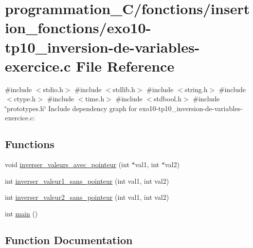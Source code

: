 \hypertarget{exo10-tp10__inversion-de-variables-exercice_8c}{}\section{programmation\+\_\+\+C/fonctions/insertion\+\_\+fonctions/exo10-\/tp10\+\_\+inversion-\/de-\/variables-\/exercice.c File Reference}
\label{exo10-tp10__inversion-de-variables-exercice_8c}
{\ttfamily \#include $<$stdio.\+h$>$}\newline
{\ttfamily \#include $<$stdlib.\+h$>$}\newline
{\ttfamily \#include $<$string.\+h$>$}\newline
{\ttfamily \#include $<$ctype.\+h$>$}\newline
{\ttfamily \#include $<$time.\+h$>$}\newline
{\ttfamily \#include $<$stdbool.\+h$>$}\newline
{\ttfamily \#include \char`\"{}prototypes.\+h\char`\"{}}\newline
Include dependency graph for exo10-\/tp10\+\_\+inversion-\/de-\/variables-\/exercice.c\+:
\subsection*{Functions}
\begin{DoxyCompactItemize}
\item 
void \hyperlink{exo10-tp10__inversion-de-variables-exercice_8c_ab0ea24cd71a23c064745ac4d89dfed9b}{inverser\+\_\+valeurs\+\_\+avec\+\_\+pointeur} (int $\ast$val1, int $\ast$val2)
\item 
int \hyperlink{exo10-tp10__inversion-de-variables-exercice_8c_accea1ca341387ad5d9fc55265008bd92}{inverser\+\_\+valeur1\+\_\+sans\+\_\+pointeur} (int val1, int val2)
\item 
int \hyperlink{exo10-tp10__inversion-de-variables-exercice_8c_a61bfa6349eac5574acf1a04ba8c6a5cd}{inverser\+\_\+valeur2\+\_\+sans\+\_\+pointeur} (int val1, int val2)
\item 
int \hyperlink{exo10-tp10__inversion-de-variables-exercice_8c_ae66f6b31b5ad750f1fe042a706a4e3d4}{main} ()
\end{DoxyCompactItemize}


\subsection{Function Documentation}
\mbox{\label{exo10-tp10__inversion-de-variables-exercice_8c_accea1ca341387ad5d9fc55265008bd92}} 
